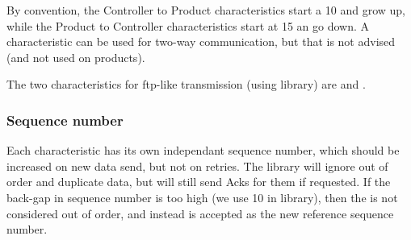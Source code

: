 By convention, the Controller to Product characteristics start a 10 and grow up, while the Product to Controller characteristics start at 15 an go down. A characteristic can be used for two-way communication, but that is not advised (and not used on products).


The two characteristics for ftp-like transmission (using  library) are  and .


\subsubsection{Sequence number}

Each characteristic has its own independant sequence number, which should be increased on new data send, but not on retries. The  library will ignore out of order and duplicate data, but will still send Acks for them if requested. If the back-gap in sequence number is too high (we use 10 in  library), then the  is not considered out of order, and instead is accepted as the new reference sequence number.

